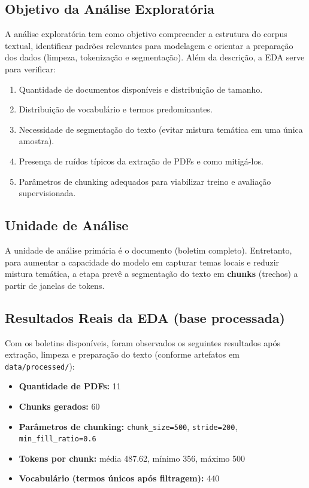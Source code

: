 \documentclass[12pt,a4paper]{article}
\begin{document}
\subsection{Objetivo da Análise Exploratória}

A análise exploratória tem como objetivo compreender a estrutura do corpus textual, identificar padrões relevantes para modelagem e orientar a preparação dos dados (limpeza, tokenização e segmentação). Além da descrição, a EDA serve para verificar:

\begin{enumerate}[leftmargin=1.2cm]
    \item Quantidade de documentos disponíveis e distribuição de tamanho.
    \item Distribuição de vocabulário e termos predominantes.
    \item Necessidade de segmentação do texto (evitar mistura temática em uma única amostra).
    \item Presença de ruídos típicos da extração de PDFs e como mitigá-los.
    \item Parâmetros de chunking adequados para viabilizar treino e avaliação supervisionada.
\end{enumerate}

\subsection{Unidade de Análise}

A unidade de análise primária é o documento (boletim completo). Entretanto, para aumentar a capacidade do modelo em capturar temas locais e reduzir mistura temática, a etapa prevê a segmentação do texto em \textbf{chunks} (trechos) a partir de janelas de tokens.

\subsection{Resultados Reais da EDA (base processada)}

Com os boletins disponíveis, foram observados os seguintes resultados após extração, limpeza e preparação do texto (conforme artefatos em \texttt{data/processed/}):

\begin{itemize}[leftmargin=1.2cm]
    \item \textbf{Quantidade de PDFs:} 11
    \item \textbf{Chunks gerados:} 60
    \item \textbf{Parâmetros de chunking:} \texttt{chunk\_size=500}, \texttt{stride=200}, \texttt{min\_fill\_ratio=0.6}
    \item \textbf{Tokens por chunk:} média 487.62, mínimo 356, máximo 500
    \item \textbf{Vocabulário (termos únicos após filtragem):} 440
\end{itemize}
\end{document}
